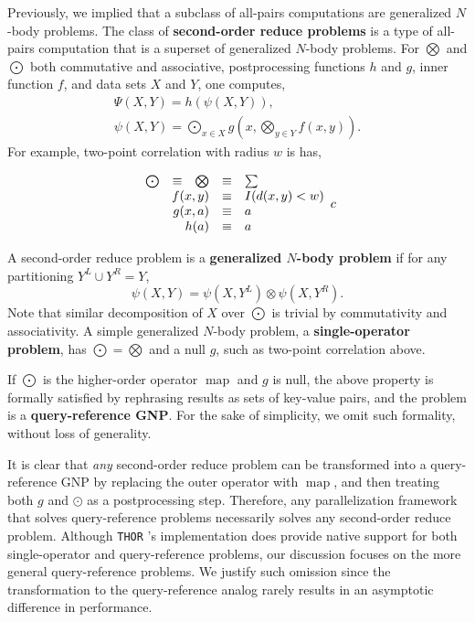 \documentclass[twoside,leqno,twocolumn]{article}
\newcommand{\THOR}{{{\tt THOR}} }
\newcommand{\union}{\cup}
\DeclareMathOperator*{\map}{map}
\newcommand{\Gnp}{\Psi}
\newcommand{\gnp}{\psi}
\newcommand{\defterm}[1]{{\bf #1}}
\newcommand{\kdleft}[1]{#1^{\!L}}
\newcommand{\kdright}[1]{#1^{\!R}}
\begin{document}
Previously, we implied that a subclass of all-pairs computations are generalized $N$-body problems.
The class of \defterm{second-order reduce problems} is a type of all-pairs computation that is a superset of generalized $N$-body problems.
For $\bigotimes$ and $\bigodot$ both commutative and associative, postprocessing functions $h$ and $g$, inner function $f$, and data sets $X$ and $Y$, one computes,
\[\begin{array}{l}
  \displaystyle \Gnp(X, Y) = h(\gnp(X, Y)),
  \\
  \displaystyle \gnp(X, Y) = \bigodot_{x \in X} g\!\left(x, \bigotimes_{y \in Y} f(x, y) \right).
\end{array}\]
\noindent
For example, two-point correlation with radius $w$ is has,

\[\begin{array}{ccccl}
  \bigodot &\equiv& \bigotimes &\equiv& \sum
  \\
  \multicolumn{3}{r}{f(x,y)} &\equiv& I(d(x,y) < w)
  \\
  \multicolumn{3}{r}{g(x, a)} &\equiv& a
  \\
  \multicolumn{3}{r}{h(a)} &\equiv& a
\end{array}{c}\]

A second-order reduce problem is a \defterm{generalized $N$-body problem} if for any partitioning $\kdleft{Y} \union \kdright{Y} = Y$,
\[\gnp(X,Y) = \gnp(X,\kdleft{Y}) \otimes \gnp(X,\kdright{Y}).\]
\noindent Note that similar decomposition of $X$ over $\bigodot$ is trivial by commutativity and associativity.
A simple generalized $N$-body problem, a \defterm{single-operator problem}, has $\bigodot = \bigotimes$ and a null $g$, such as two-point correlation above.

If $\bigodot$ is the higher-order operator $\map$ and $g$ is null, the above property is formally satisfied by rephrasing results as sets of key-value pairs, and the problem is a \defterm{query-reference GNP}.
For the sake of simplicity, we omit such formality, without loss of generality.

It is clear that {\em any} second-order reduce problem can be transformed into a query-reference GNP by replacing the outer operator with $\map$, and then treating both $g$ and $\odot$ as a postprocessing step.
Therefore, any parallelization framework that solves query-reference problems necessarily solves any second-order reduce problem.
Although \THOR's implementation does provide native support for both single-operator and query-reference problems, our discussion focuses on the more general query-reference problems.
We justify such omission since the transformation to the query-reference analog rarely results in an asymptotic difference in performance.
\end{document}
